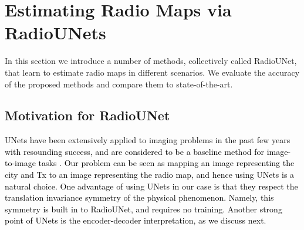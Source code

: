 \documentclass[10pt,a4paper]{article}
\begin{document}
\section{Estimating Radio Maps via RadioUNets}

In this section we introduce a number of methods,  collectively called RadioUNet, that learn to estimate radio maps in different scenarios. We evaluate the accuracy of the proposed methods and compare them to state-of-the-art.

\subsection{Motivation for RadioUNet}

\textcolor{black}{UNets have been extensively applied to imaging problems in the past few years with resounding success, and are considered to be a baseline method for image-to-image tasks \cite{UNetBase}. Our problem can be seen as mapping an image representing the city and Tx to an image representing the radio map, and hence using UNets is a natural choice.
%
One advantage of using UNets in our case is that they respect the translation invariance symmetry of the physical phenomenon. Namely, this symmetry is built in to RadioUNet, and requires no training. Another strong point of UNets is the encoder-decoder interpretation, as we discuss next.}
\end{document}

